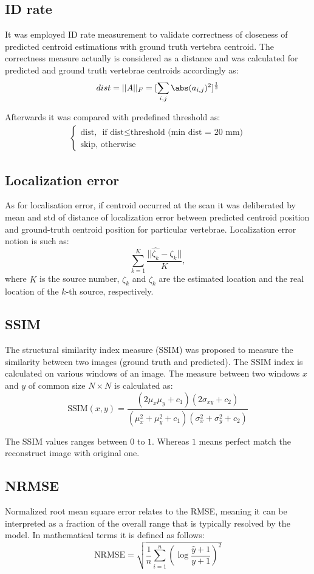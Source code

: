 \subsection{ID rate}
It was employed ID rate measurement to validate correctness of closeness of predicted centroid estimations with ground truth vertebra centroid. The correctness measure actually is considered as a distance and was calculated for predicted and ground truth vertebrae centroids accordingly as:
\[ dist = ||A||_F = [\sum_{i,j} \abs(a_{i,j})^2]^{\frac{1}{2}} \]

Afterwards it was compared with predefined threshold as:
\begin{align*}
\begin{cases}
\text{dist, } \mbox{ if } \text{dist} \leq \text{threshold (min dist = 20 mm)} \\ 
\text{skip}, \mbox{ otherwise} \end{cases}
\end{align*}

\subsection{Localization error}
As for localisation error, if centroid occurred at the scan it was deliberated by mean and std of distance of localization error between predicted centroid position and ground-truth centroid position for particular vertebrae. Localization error notion is such as:
\[ \sum_{k=1}^K \frac{||\hat{\zeta_k} - \zeta_k || }{K}, \]
where $K$ is the source number, $\hat{\zeta_k}$ and $\zeta_k$ are the estimated location and the real location of the $k$-th source, respectively.

\subsection{SSIM}
The structural similarity index measure (SSIM) was proposed to measure the similarity between two images (ground truth and predicted). The SSIM index is calculated on various windows of an image. The measure between two windows  $x$ and $y$ of common size $N \times N$ is calculated as: 
\[ \text{SSIM}(x,y) = \frac{(2\mu_x\mu_y + c_1)(2\sigma_{xy}+c_2)}{(\mu_x^2+\mu_y^2+c_1)(\sigma_x^2+\sigma_y^2+c_2)}\]

The SSIM values ranges between $0$ to $1$. Whereas $1$ means perfect match the reconstruct image with original one.

\subsection{NRMSE}
Normalized root mean square error relates to the RMSE, meaning it can be interpreted as a fraction of the overall range that is typically resolved by the model. In mathematical terms it is defined as follows:
\[ \text{NRMSE} = \sqrt{\frac{1}{n} \sum_{i=1}^n\left(\log \frac{\hat{y}+1}{y+1}\right)^2} \]


